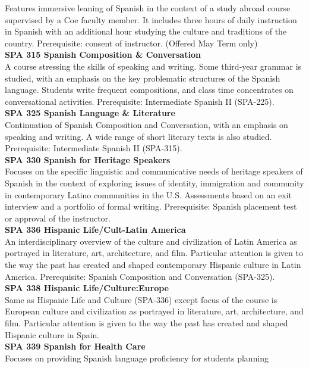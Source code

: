 \documentclass[
  letterpaper,
]{scrbook}
\begin{document}
Features immersive leaning of Spanish in the context of a study abroad
course supervised by a Coe faculty member. It includes three hours of
daily instruction in Spanish with an additional hour studying the
culture and traditions of the country. Prerequisite: consent of
instructor. (Offered May Term only)\\
\textbf{SPA 315 Spanish Composition \& Conversation}\\
A course stressing the skills of speaking and writing. Some third-year
grammar is studied, with an emphasis on the key problematic structures
of the Spanish language. Students write frequent compositions, and class
time concentrates on conversational activities. Prerequisite:
Intermediate Spanish II (SPA-225).\\
\textbf{SPA 325 Spanish Language \& Literature}\\
Continuation of Spanish Composition and Conversation, with an emphasis
on speaking and writing. A wide range of short literary texts is also
studied. Prerequisite: Intermediate Spanish II (SPA-315).\\
\textbf{SPA 330 Spanish for Heritage Speakers}\\
Focuses on the specific linguistic and communicative needs of heritage
speakers of Spanish in the context of exploring issues of identity,
immigration and community in contemporary Latino communities in the U.S.
Assessments based on an exit interview and a portfolio of formal
writing. Prerequisite: Spanish placement test or approval of the
instructor.\\
\textbf{SPA 336 Hispanic Life/Cult-Latin America}\\
An interdisciplinary overview of the culture and civilization of Latin
America as portrayed in literature, art, architecture, and film.
Particular attention is given to the way the past has created and shaped
contemporary Hispanic culture in Latin America. Prerequisite: Spanish
Composition and Conversation (SPA-325).\\
\textbf{SPA 338 Hispanic Life/Culture:Europe}\\
Same as Hispanic Life and Culture (SPA-336) except focus of the course
is European culture and civilization as portrayed in literature, art,
architecture, and film. Particular attention is given to the way the
past has created and shaped Hispanic culture in Spain.\\
\textbf{SPA 339 Spanish for Health Care}\\
Focuses on providing Spanish language proficiency for students planning
\end{document}
